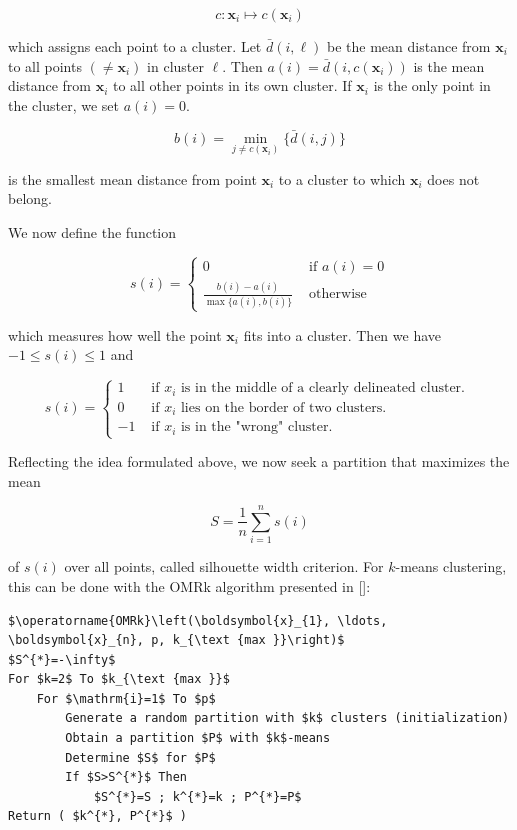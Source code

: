 \documentclass[10pt]{book}
\begin{document}
$$
c: \boldsymbol{x}_{i} \mapsto c\left(\boldsymbol{x}_{i}\right)
$$

which assigns each point to a cluster. Let $\bar{d}(i, \ell)$ be the mean distance from $\boldsymbol{x}_{i}$ to all points $\left(\neq \boldsymbol{x}_{i}\right)$ in cluster $\ell$. Then $a(i)=\bar{d}\left(i, c\left(\boldsymbol{x}_{i}\right)\right)$ is the mean distance from $\boldsymbol{x}_{i}$ to all other points in its own cluster. If $\boldsymbol{x}_{i}$ is the only point in the cluster, we set $a(i)=0$.

$$
b(i)=\min _{j \neq c\left(\boldsymbol{x}_{i}\right)}\{\bar{d}(i, j)\}
$$

is the smallest mean distance from point $\boldsymbol{x}_{i}$ to a cluster to which $\boldsymbol{x}_{i}$ does not belong.

We now define the function

$$
s(i)=\left\{\begin{array}{cc}
0 & \text { if } a(i)=0 \\
\frac{b(i)-a(i)}{\max \{a(i), b(i)\}} & \text { otherwise }
\end{array}\right.
$$

which measures how well the point $\boldsymbol{x}_{i}$ fits into a cluster. Then we have $-1 \leq s(i) \leq 1$ and

$$
s(i)= \begin{cases}1 & \text { if } x_{i} \text { is in the middle of a clearly delineated cluster. } \\ 0 & \text { if } x_{i} \text { lies on the border of two clusters. } \\ -1 & \text { if } x_{i} \text { is in the "wrong" cluster. }\end{cases}
$$

Reflecting the idea formulated above, we now seek a partition that maximizes the mean

$$
S=\frac{1}{n} \sum_{i=1}^{n} s(i)
$$

of $s(i)$ over all points, called silhouette width criterion. For $k$-means clustering, this can be done with the OMRk algorithm presented in [\cite{barros2014oblique}]:

\begin{verbatim}
$\operatorname{OMRk}\left(\boldsymbol{x}_{1}, \ldots, \boldsymbol{x}_{n}, p, k_{\text {max }}\right)$
$S^{*}=-\infty$
For $k=2$ To $k_{\text {max }}$
    For $\mathrm{i}=1$ To $p$
        Generate a random partition with $k$ clusters (initialization)
        Obtain a partition $P$ with $k$-means
        Determine $S$ for $P$
        If $S>S^{*}$ Then
            $S^{*}=S ; k^{*}=k ; P^{*}=P$
Return ( $k^{*}, P^{*}$ )
\end{verbatim}
\end{document}
